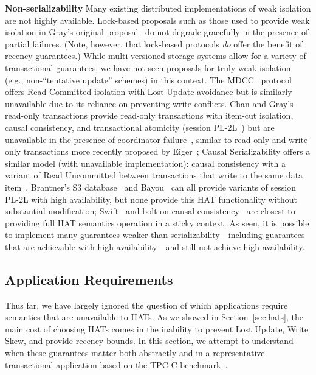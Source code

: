 \vspace{.5em}\noindent\textbf{Non-serializability} Many existing
distributed implementations of weak isolation are not highly
available. Lock-based proposals such as those used to provide weak
isolation in Gray's original proposal~\cite{gray-isolation} do not
degrade gracefully in the presence of partial failures. (Note,
however, that lock-based protocols \textit{do} offer the benefit of
recency guarantees.) While multi-versioned storage systems allow for a
variety of transactional guarantees, we have not seen proposals for
truly weak isolation (e.g., non-``tentative update'' schemes) in this
context.  The MDCC~\cite{mdcc} protocol offers Read Committed
isolation with Lost Update avoidance but is similarly unavailable due
to its reliance on preventing write conflicts. Chan and Gray's
read-only transactions provide read-only transactions with item-cut
isolation, causal consistency, and transactional atomicity (session
PL-2L~\cite{adya}) but are unavailable in the presence of coordinator
failure~\cite{readonly}, similar to read-only and write-only
transactions more recently proposed by Eiger~\cite{eiger}; Causal
Serializability offers a similar model (with unavailable
implementation): causal consistency with a variant of Read Uncommitted
between transactions that write to the same data
item~\cite{raynal-causal}.  Brantner's S3 database~\cite{kraska-s3}
and Bayou~\cite{sessionguarantees} can all provide variants of session
PL-2L with high availability, but none provide this HAT functionality
without substantial modification; Swift~\cite{swift} and bolt-on
causal consistency~\cite{bolton} are closest to providing full HAT
semantics operation in a sticky context. As seen, it is possible to
implement many guarantees weaker than serializability---including
guarantees that are achievable with high availability---and still not
achieve high availability.

\subsection{Application Requirements}

Thus far, we have largely ignored the question of which applications
require semantics that are unavailable to HATs. As we showed in
Section~\ref{sec:hats}, the main cost of choosing HATs comes in the
inability to prevent Lost Update, Write Skew, and provide recency
bounds. In this section, we attempt to understand when these
guarantees matter both abstractly and in a representative
transactional application based on the TPC-C benchmark~\cite{tpcc}.

